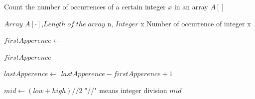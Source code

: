 \documentclass[paper=a4, fontsize=11pt]{scrartcl} %
\numberwithin{equation}{section} %
\numberwithin{figure}{section} %
\numberwithin{table}{section} %
\begin{document}
\begin{algorithm}
        \caption{Count the number of occurrences of a certain integer $x$ in an array $A[]$}
        \begin{algorithmic}[1] %
            \Require  $Array$ $A[\cdot]$,$Length\;of\;the\;array$ n, $Integer$ x
            \Ensure   Number of occurrence of integer x  
            
            	\State $firstApperence \gets $
            	
            	\State \Return $firstApperence$
            	\EndIf
            	
            	\State $lastApperence\gets$ 
            	\State \Return $lastApperence-firstApperence+1$
            	
                
                
            \EndFunction
           \State
            
            \State $mid\gets(low + high)//2$ \Comment "//" means integer division
            \EndIf
            \State \Return $mid$
            \Else
            	\State \Return {}
            	\Else
            	\State \Return {}
            	\EndIf
            \EndIf
            \State {}
            
            \EndFunction
            

\end{algorithmic}
\end{algorithm}
\end{document}
